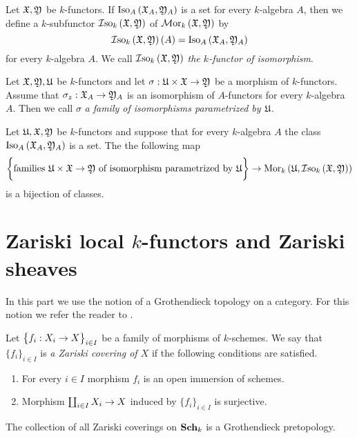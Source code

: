 \begin{definition}
Let ${\mathfrak X},{\mathfrak Y}$ be $k$-functors. If $\mathrm{Iso}_{A}\left({\mathfrak X}_A,{\mathfrak Y}_A\right)$ is a set for every $k$-algebra $A$, then we define a $k$-subfunctor $\mathcal{I}\mathrm{so}_k\left({\mathfrak X},{\mathfrak Y}\right)$ of $\mathcal{M}\mathrm{or}_k\left({\mathfrak X},{\mathfrak Y}\right)$ by
$$\mathcal{I}\mathrm{so}_k\left({\mathfrak X},{\mathfrak Y}\right)(A) = \mathrm{Iso}_A\left({\mathfrak X}_A,{\mathfrak Y}_A\right)$$
for every $k$-algebra $A$. We call $\mathcal{I}\mathrm{so}_k\left({\mathfrak X},{\mathfrak Y}\right)$ \textit{the $k$-functor of isomorphism}.
\end{definition}

\begin{definition}
Let ${\mathfrak X}, {\mathfrak Y},{\mathfrak U}$ be $k$-functors and let $\sigma:{\mathfrak U}\times {\mathfrak X} \rightarrow {\mathfrak Y}$ be a morphism of $k$-functors. Assume that $\sigma_z:{\mathfrak X}_A\rightarrow {\mathfrak Y}_A$ is an isomorphism of $A$-functors for every $k$-algebra $A$. Then we call $\sigma$ \textit{a family of isomorphisms parametrized by ${\mathfrak U}$}.
\end{definition}

\begin{corollary}\label{corollary:hom_isomorphism_bijection}
Let ${\mathfrak U},{\mathfrak X},{\mathfrak Y}$ be $k$-functors and suppose that for every $k$-algebra $A$ the class $\mathrm{Iso}_A\left({\mathfrak X}_A,{\mathfrak Y}_A\right)$ is a set. The the following map
$$\bigg\{\mbox{families }{\mathfrak U}\times {\mathfrak X}\rightarrow {\mathfrak Y}\mbox{ of isomorphism parametrized by }{\mathfrak U}\bigg\}\rightarrow \mathrm{Mor}_k\left({\mathfrak U},\mathcal{I}\mathrm{so}_k\left({\mathfrak X},{\mathfrak Y}\right)\right)$$
is a bijection of classes.
\end{corollary}


\section{Zariski local $k$-functors and Zariski sheaves}
\noindent
In this part we use the notion of a Grothendieck topology on a category. For this notion we refer the reader to \cite{Sheaves}.

\begin{definition}
Let $\big\{f_i:X_i\rightarrow X\big\}_{i\in I}$ be a family of morphisms of $k$-schemes. We say that $\{f_i\}_{i\in I}$ is \textit{a Zariski covering of $X$} if the following conditions are satisfied.
\begin{enumerate}[label=\textbf{(\arabic*)}, leftmargin=1.5em]
\item For every $i\in I$ morphism $f_i$ is an open immersion of schemes.
\item Morphism $\coprod_{i\in I}X_i\rightarrow X$ induced by $\big\{f_i\big\}_{i\in I}$ is surjective.
\end{enumerate}
\end{definition}
\noindent
The collection of all Zariski coverings on $\mathbf{Sch}_k$ is a Grothendieck pretopology.

